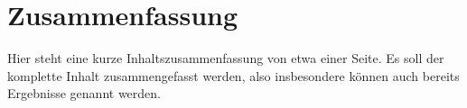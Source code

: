 \cleardoublepage
\chapter*{Zusammenfassung}

Hier steht eine kurze Inhaltszusammenfassung von etwa einer Seite.
Es soll der komplette Inhalt zusammengefasst werden, also insbesondere können auch bereits Ergebnisse genannt werden.

